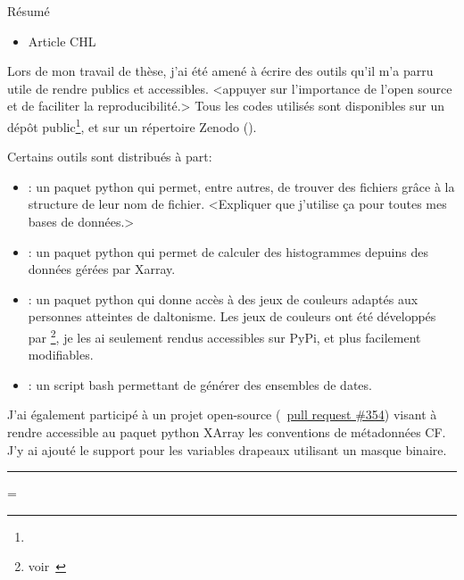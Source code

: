 
Résumé


\clearpage
{}
\label{sec:productions}

\begin{itemize}
        \item Article CHL
\end{itemize}
\medskip

Lors de mon travail de thèse, j'ai été amené à écrire des outils qu'il m'a parru utile de rendre publics et accessibles.
<appuyer sur l'importance de l'open source et de faciliter la reproducibilité.>
Tous les codes utilisés sont disponibles sur un dépôt public\footnote{%
}, et sur un répertoire Zenodo ().
\medskip

Certains outils sont distribués à part:
\begin{itemize}
  \item {}:
        un paquet python qui permet, entre autres, de trouver des fichiers grâce à la structure de leur nom de fichier.
        <Expliquer que j'utilise ça pour toutes mes bases de données.>
  \item {}:
        un paquet python qui permet de calculer des histogrammes depuins des données gérées par Xarray.
  \item {}:
        un paquet python qui donne accès à des jeux de couleurs adaptés aux personnes atteintes de daltonisme. Les jeux de couleurs ont été développés par \footnote{voir~}, je les ai seulement rendus accessibles sur PyPi, et plus facilement modifiables.
  \item {}:
        un script bash permettant de générer des ensembles de dates.
\end{itemize}
\medskip

J'ai également participé à un projet open-source (~\href{https://github.com/xarray-contrib/cf-xarray/pull/354}{pull request \#354}) visant à rendre accessible au paquet python XArray les conventions de métadonnées CF.
J'y ai ajouté le support pour les variables drapeaux utilisant un masque binaire.

\begin{center}
  \vspace{1\baselineskip}
  \rule{0.77\textwidth}{0.5pt}
  \vspace{1\baselineskip}
\end{center}

{%
  \raggedright%
  \emergencystretch=\textwidth
  \printbibliography[heading=none, type=software, keyword=personnal]
}
